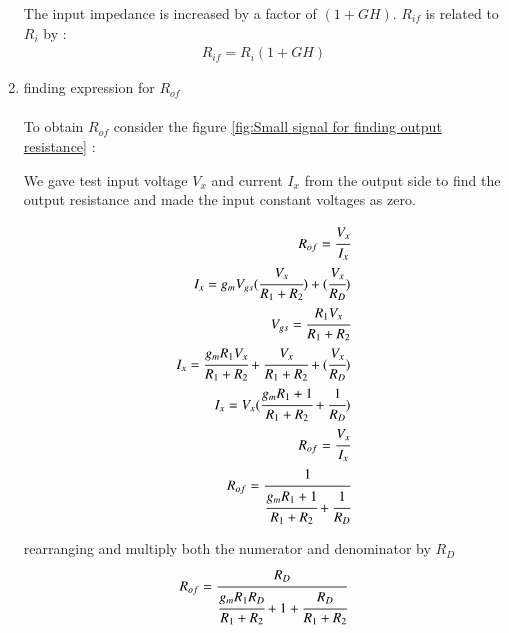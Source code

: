 \begin{enumerate}[label=\arabic*.,ref=\theenumi]
The input impedance is increased by a factor of $(1+GH)$.
$R_{if}$ is related to $R_{i}$ by :\\
\begin{align}
R_{if} = R_{i}(1 + GH)
\end{align}



%
\item finding expression for $R_{of}$\\
\solution\\

To obtain $R_{of}$ consider the figure \ref{fig:Small signal for finding output resistance} :



We gave test input voltage $V_{x}$ and current $I_{x}$ from the output side to find the output resistance and made the input constant voltages as zero.

\begin{align}
R_{of} = \cfrac{V_{x}}{I_{x}}\\
I_{x} = g_{m}V_{gs}(\cfrac{V_{x}}{R_{1}+R_{2}})+(\cfrac{V_{x}}{R_{D}})\\
V_{gs} = \cfrac{R_{1}V_{x}}{R_{1}+R_{2}}\\
I_{x} = \cfrac{g_{m}R_{1}V_{x}}{R_{1}+R_{2}}+\cfrac{V_{x}}{R_{1}+R_{2}}+(\cfrac{V_{x}}{R_{D}})\\
I_{x} = V_{x}(\cfrac{g_{m}R_{1}+1}{R_{1}+R_{2}} + \cfrac{1}{R_{D}})\\
R_{of} = \cfrac{V_{x}}{I_{x}}\\ R_{of} = \cfrac{1}{\cfrac{g_{m}R_{1}+1}{R_{1}+R_{2}}+\cfrac{1}{R_{D}}}
\end{align}



rearranging and multiply both the numerator and denominator by $R_{D}$\\

\begin{align}
R_{of} = \cfrac{R_{D}}{\cfrac{g_{m}R_{1}R_{D}}{R_{1}+R_{2}}+1+\cfrac{R_{D}}{R_{1}+R_{2}}}
\end{align}


\end{enumerate}
